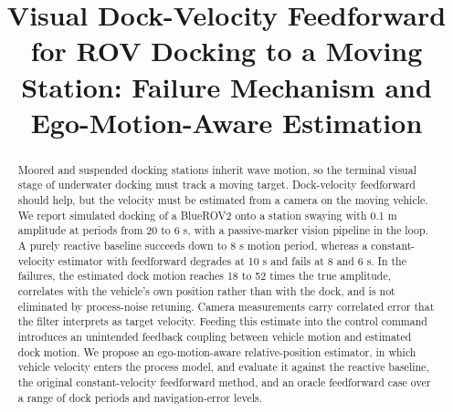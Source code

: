 \documentclass[conference,a4paper]{IEEEtran}
\begin{document}
\title{Visual Dock-Velocity Feedforward for ROV Docking to a Moving Station: Failure Mechanism and Ego-Motion-Aware Estimation}

\author{
\and
{}
}

\maketitle

\begin{abstract}
Moored and suspended docking stations inherit wave motion, so the terminal visual stage of underwater docking must track a moving target. Dock-velocity feedforward should help, but the velocity must be estimated from a camera on the moving vehicle. We report simulated docking of a BlueROV2 onto a station swaying with 0.1 m amplitude at periods from 20 to 6 s, with a passive-marker vision pipeline in the loop. A purely reactive baseline succeeds down to 8 s motion period, whereas a constant-velocity estimator with feedforward degrades at 10 s and fails at 8 and 6 s. In the failures, the estimated dock motion reaches 18 to 52 times the true amplitude, correlates with the vehicle's own position rather than with the dock, and is not eliminated by process-noise retuning. Camera measurements carry correlated error that the filter interprets as target velocity. Feeding this estimate into the control command introduces an unintended feedback coupling between vehicle motion and estimated dock motion. We propose an ego-motion-aware relative-position estimator, in which vehicle velocity enters the process model, and evaluate it against the reactive baseline, the original constant-velocity feedforward method, and an oracle feedforward case over a range of dock periods and navigation-error levels.
\end{abstract}
\end{document}
